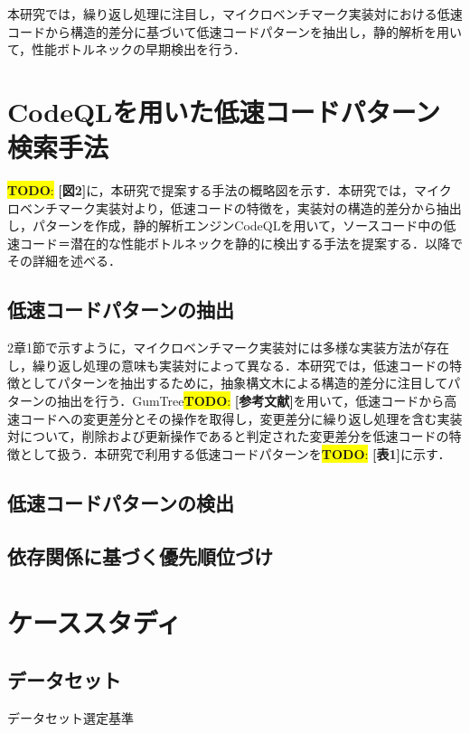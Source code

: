 \documentclass[submit,techrep,noauthor]{ipsj}
\newcommand{\todo}[1]{\colorbox{yellow}{{\bf TODO}:}{\color{red} {\textbf{[#1]}}}}
\begin{document}
本研究では，繰り返し処理に注目し，マイクロベンチマーク実装対における低速コードから構造的差分に基づいて低速コードパターンを抽出し，静的解析を用いて，性能ボトルネックの早期検出を行う．


\section{CodeQLを用いた低速コードパターン検索手法}
\label{sec3:format}

\todo{図2}に，本研究で提案する手法の概略図を示す．本研究では，マイクロベンチマーク実装対より，低速コードの特徴を，実装対の構造的差分から抽出し，パターンを作成，静的解析エンジンCodeQLを用いて，ソースコード中の低速コード＝潜在的な性能ボトルネックを静的に検出する手法を提案する．以降でその詳細を述べる．

\subsection{低速コードパターンの抽出}

2章1節で示すように，マイクロベンチマーク実装対には多様な実装方法が存在し，繰り返し処理の意味も実装対によって異なる．本研究では，低速コードの特徴としてパターンを抽出するために，抽象構文木による構造的差分に注目してパターンの抽出を行う．GumTree\todo{参考文献}を用いて，低速コードから高速コードへの変更差分とその操作を取得し，変更差分に繰り返し処理を含む実装対について，削除および更新操作であると判定された変更差分を低速コードの特徴として扱う．本研究で利用する低速コードパターンを\todo{表1}に示す．

\subsection{低速コードパターンの検出}

\subsection{依存関係に基づく優先順位づけ}

\section{ケーススタディ}
\label{sec4:format}


\subsection{データセット}

データセット選定基準
\end{document}
